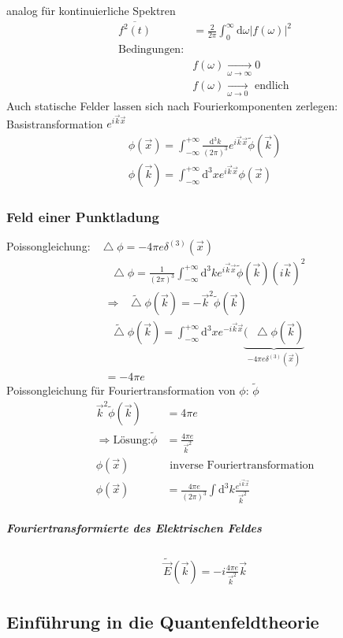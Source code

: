 \documentclass[a4paper]{article}
\newcommand*\laplace{\mathop{}\!\mathbin\bigtriangleup}
\begin{document}
analog für kontinuierliche Spektren
\begin{align}
\overline{f^2(t)}&=\frac{2}{2\pi}\int_0^\infty \mathrm{d}\omega |f(\omega)|^2\\
\text{Bedingungen:}&\\
&f(\omega)\underset{\omega\rightarrow\infty}{\longrightarrow}0\\
&f(\omega)\underset{\omega\rightarrow0}{\longrightarrow} \text{ endlich}
\end{align}
Auch statische Felder lassen sich nach Fourierkomponenten zerlegen:
Basistransformation $e^{i\vec{k}\vec{x}}$
\begin{align}
\phi(\vec{x})=\int_{-\infty}^{+\infty} \frac{\mathrm{d}^3k}{(2\pi)^3}
e^{i\vec{k}\vec{x}}\tilde{\phi}(\vec{k})\\
\phi(\vec{k})=\int_{-\infty}^{+\infty} \mathrm{d}^3x
e^{i\vec{k}\vec{x}}\phi(\vec{x})
\end{align}
\subsubsection{Feld einer Punktladung}
Poissongleichung: $\laplace\phi=-4\pi e \delta^{(3)}(\vec{x})$
\begin{align}
\laplace\phi=\frac{1}{(2\pi)^3}\int_{-\infty}^{+\infty} \mathrm{d}^3k e^{i\vec{k}\vec{x}}
\tilde{\phi}(\vec{k})(i\vec{k})^2\\
\Rightarrow \tilde{\laplace \phi}(\vec{k})=-\vec{k}^2 \tilde{\phi}(\vec{k})\\
\tilde{\laplace \phi}(\vec{k})=\int_{-\infty}^{+\infty}\mathrm{d}^3x e^{-i\vec{k}\vec{x}}
\underbrace{(\laplace\phi(\vec{k})}_{-4\pi e \delta^{(3)}(\vec{x})}\\
=-4\pi e
\end{align}
Poissongleichung für Fouriertransformation von $\phi$: $\tilde{\phi}$
\begin{align}
\vec{k}^2\tilde{\phi}(\vec{k})&=4\pi e\\
\Rightarrow \text{Lösung:} \tilde{\phi}&=\frac{4\pi e}{\vec{k}^2}\\
\phi(\vec{x})&\text{ inverse Fouriertransformation}\\
\phi(\vec{x})&=\frac{4\pi e}{(2\pi)^3}\int \mathrm{d}^3k
\frac{e^{i\vec{k}\vec{x}}}{\vec{k}^2}
\end{align}
\subparagraph{Fouriertransformierte des Elektrischen Feldes}
\begin{align}
\tilde{\vec{E}}(\vec{k})=-i\frac{4\pi e}{\vec{k}^2}\vec{k}
\end{align}
\subsection{Einführung in die Quantenfeldtheorie}
\end{document}
